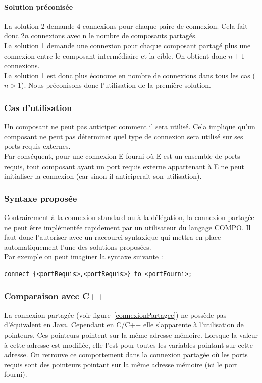 \documentclass[11pt,a4paper,openany,oneside]{book}
\begin{document}
\paragraph{Solution préconisée}
La solution 2 demande 4 connexions pour chaque paire de connexion. Cela fait donc $2n$ connexions avec n le nombre de composants partagés.\\
La solution 1 demande une connexion pour chaque composant partagé plus une connexion entre le composant intermédiaire et la cible. On obtient donc $n+1$ connexions.\\
La solution 1 est donc plus économe en nombre de connexions dans tous les cas ($n>1$). Nous préconisons donc l'utilisation de la première solution.

\subsubsection{Cas d'utilisation}
Un composant ne peut pas anticiper comment il sera utilisé. Cela implique qu'un composant ne peut pas déterminer quel type de connexion sera utilisé sur ses ports requis externes.\\
Par conséquent, pour une connexion E-fourni où E est un ensemble de ports requis, tout composant ayant un port requis externe appartenant à E ne peut initialiser la connexion (car sinon il anticiperait son utilisation).

\subsubsection{Syntaxe proposée}
Contrairement à la connexion standard ou à la délégation, la connexion partagée ne peut être implémentée rapidement par un utilisateur du langage COMPO. Il faut donc l'autoriser avec un raccourci syntaxique qui mettra en place automatiquement l'une des solutions proposées.\\
Par exemple on peut imaginer la syntaxe suivante : 
\begin{lstlisting}[language=Compo, frame=single,caption=Syntaxe de création d'une connexion partagée]
connect {<portRequis>,<portRequis>} to <portFourni>;
\end{lstlisting}

\subsubsection{Comparaison avec C++}
		
La connexion partagée (voir figure~\ref{connexionPartagee}) ne possède pas d'équivalent en Java. Cependant en C/C++ elle s'apparente à l'utilisation de pointeurs. Ces pointeurs pointent sur la même adresse mémoire. Lorsque la valeur à cette adresse est modifiée, elle l'est pour toutes les variables pointant sur cette adresse. On retrouve ce comportement dans la connexion partagée où les ports requis sont des pointeurs pointant sur la même adresse mémoire (ici le port fourni).
\end{document}
